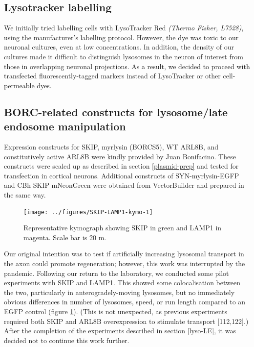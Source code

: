 \documentclass[
  12pt,
  a4paper,
]{book}
\begin{document}
\subsection{Lysotracker labelling}\label{lysotracker-labelling}

We initially tried labelling cells with LysoTracker Red \emph{(Thermo Fisher, L7528)}, using the manufacturer's labelling protocol. However, the dye was toxic to our neuronal cultures, even at low concentrations. In addition, the density of our cultures made it difficult to distinguish lysosomes in the neuron of interest from those in overlapping neuronal projections. As a result, we decided to proceed with transfected fluorescently-tagged markers instead of LysoTracker or other cell-permeable dyes.

\subsection{BORC-related constructs for lysosome/late endosome manipulation}\label{borc-related-constructs-for-lysosomelate-endosome-manipulation}

Expression constructs for SKIP, myrlysin (BORCS5), WT ARL8B, and constitutively active ARL8B were kindly provided by Juan Bonifacino. These constructs were scaled up as described in section \ref{plasmid-prep} and tested for transfection in cortical neurons. Additional constructs of SYN-myrlysin-EGFP and CBh-SKIP-mNeonGreen were obtained from VectorBuilder and prepared in the same way.

\vspace{14pt}
\begin{figure}
\texttt{[image: ../figures/SKIP-LAMP1-kymo-1]} \caption[SKIP and LAMP1 representative kymograph]{Representative kymograph showing SKIP in green and LAMP1 in magenta.  Scale bar is 20 \textmu{}m.}\label{fig:SKIP-LAMP1-kymo}
\end{figure}

Our original intention was to test if artificially increasing lysosomal transport in the axon could promote regeneration; however, this work was interrupted by the pandemic. Following our return to the laboratory, we conducted some pilot experiments with SKIP and LAMP1. This showed some colocalisation between the two, particularly in anterogradely-moving lysosomes, but no immediately obvious differences in number of lysosomes, speed, or run length compared to an EGFP control (figure \ref{fig:SKIP-LAMP1-kymo}). (This is not unexpected, as previous experiments required both SKIP and ARL8B overexpression to stimulate transport {[}112,122{]}.) After the completion of the experiments described in section \ref{lyso-LE}, it was decided not to continue this work further.
\end{document}
